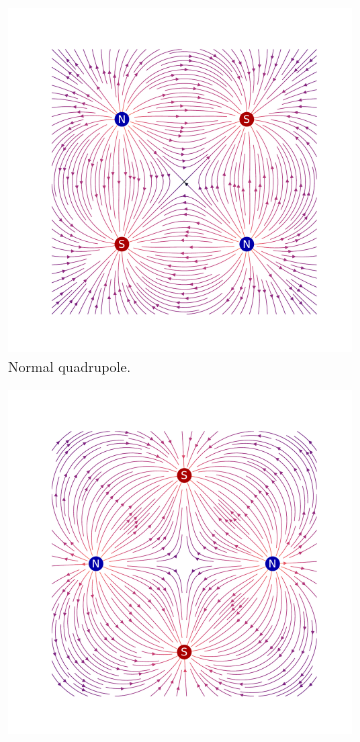 \begin{figure}[!hbt]
    \centering
    \begin{subfigure}[b]{0.49\textwidth}
        \centering
        \includegraphics[width=\textwidth]{Figures/Beam_Dynamics_Theory/bfield_normal_multipole_order_2.pdf}
        \caption{Normal quadrupole.}
        \label{subfigure:normal_quadrupole}
    \end{subfigure}
    \hfill
    \begin{subfigure}[b]{0.49\textwidth}
        \centering
        \includegraphics[width=\textwidth]{Figures/Beam_Dynamics_Theory/bfield_skew_multipole_order_2.pdf}

\end{subfigure}
\end{figure}
